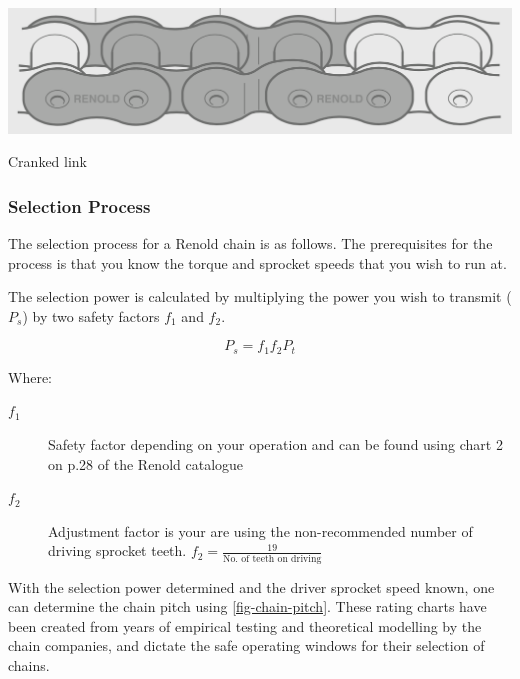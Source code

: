 \begin{marginfigure}
    \centering
    \includegraphics[width=\textwidth]{07_transmission_selection/cranked-link.png}
    \caption[Cranked link]{Cranked link~\citep[p.11]{renoldchain}}
    \label{fig-cranked-link}
\end{marginfigure}

\subsubsection{Selection Process}

The selection process for a Renold chain is as follows. The prerequisites for the process is that you know the torque and sprocket speeds that you wish to run at.

The selection power is calculated by multiplying the power you wish to transmit (\(P_s\)) by two safety factors \(f_1\) and \(f_2\).

\begin{equation}
  P_s = f_1f_2P_t
\end{equation}

\noindent Where:

\begin{description}
  \item[\(f_1\)] Safety factor depending on your operation and can be found using chart 2 on p.28 of the Renold catalogue
  \item[\(f_2\)] Adjustment factor is your are using the non-recommended number of driving sprocket teeth. \(f_2=\frac{19}{\text{No. of teeth on driving}}\)
\end{description}

With the selection power determined and the driver sprocket speed known, one can determine the chain pitch using \cref{fig-chain-pitch}. These rating charts have been created from years of empirical testing and theoretical modelling by the chain companies, and dictate the safe operating windows for their selection of chains.

